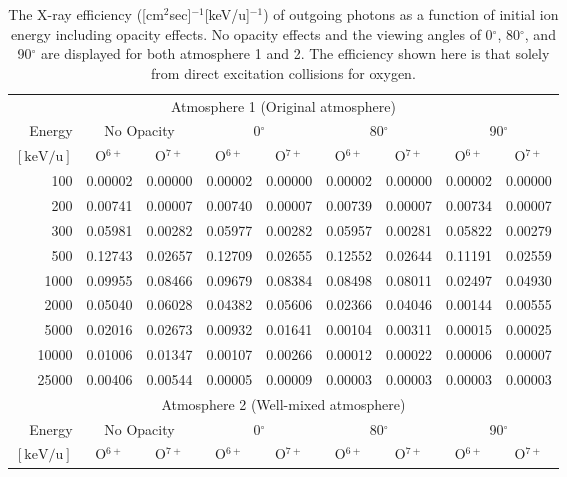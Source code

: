 \begin{table}[ht]
    \centering
    \caption{The X-ray efficiency ([cm$^2$sec]$^{-1}$[keV/u]$^{-1}$) of outgoing photons as a function of initial ion energy including opacity effects. No opacity effects and the viewing angles of 0$^\circ$, 80$^\circ$, and 90$^\circ$ are displayed for both atmosphere 1 and 2. The efficiency shown here is that solely from direct excitation collisions for oxygen.}
    \begin{tabular}{r|c|c|c|c|c|c|c|c}
    \multicolumn{9}{c}{Atmosphere 1 (Original atmosphere)} \\ \cline{2-9}
    Energy & \multicolumn{2}{c|}{No Opacity} & \multicolumn{2}{c|}{0$^\circ$} & \multicolumn{2}{c|}{80$^\circ$} & \multicolumn{2}{c}{90$^\circ$} \\ \cline{2-9}
    $\mathrm{[keV/u]}$ & O$^{6+}$ & O$^{7+}$ & O$^{6+}$ & O$^{7+}$ & O$^{6+}$ & O$^{7+}$ & O$^{6+}$ & O$^{7+}$ \\ \cline{1-9}
    100   & 0.00002 & 0.00000 & 0.00002 & 0.00000 & 0.00002 & 0.00000 & 0.00002 & 0.00000 \\
    200   & 0.00741 & 0.00007 & 0.00740 & 0.00007 & 0.00739 & 0.00007 & 0.00734 & 0.00007 \\
    300   & 0.05981 & 0.00282 & 0.05977 & 0.00282 & 0.05957 & 0.00281 & 0.05822 & 0.00279 \\
    500   & 0.12743 & 0.02657 & 0.12709 & 0.02655 & 0.12552 & 0.02644 & 0.11191 & 0.02559 \\
    1000  & 0.09955 & 0.08466 & 0.09679 & 0.08384 & 0.08498 & 0.08011 & 0.02497 & 0.04930 \\
    2000  & 0.05040 & 0.06028 & 0.04382 & 0.05606 & 0.02366 & 0.04046 & 0.00144 & 0.00555 \\
    5000  & 0.02016 & 0.02673 & 0.00932 & 0.01641 & 0.00104 & 0.00311 & 0.00015 & 0.00025 \\
    10000 & 0.01006 & 0.01347 & 0.00107 & 0.00266 & 0.00012 & 0.00022 & 0.00006 & 0.00007 \\
    25000 & 0.00406 & 0.00544 & 0.00005 & 0.00009 & 0.00003 & 0.00003 & 0.00003 & 0.00003 \\ \cline{1-9}
    \multicolumn{9}{c}{Atmosphere 2 (Well-mixed atmosphere)} \\ \cline{2-9}
    Energy & \multicolumn{2}{c|}{No Opacity} & \multicolumn{2}{c|}{0$^\circ$} & \multicolumn{2}{c|}{80$^\circ$} & \multicolumn{2}{c}{90$^\circ$} \\ \cline{2-9}
    $\mathrm{[keV/u]}$ & O$^{6+}$ & O$^{7+}$ & O$^{6+}$ & O$^{7+}$ & O$^{6+}$ & O$^{7+}$ & O$^{6+}$ & O$^{7+}$ \\ \cline{1-9}

\end{tabular}
\end{table}
